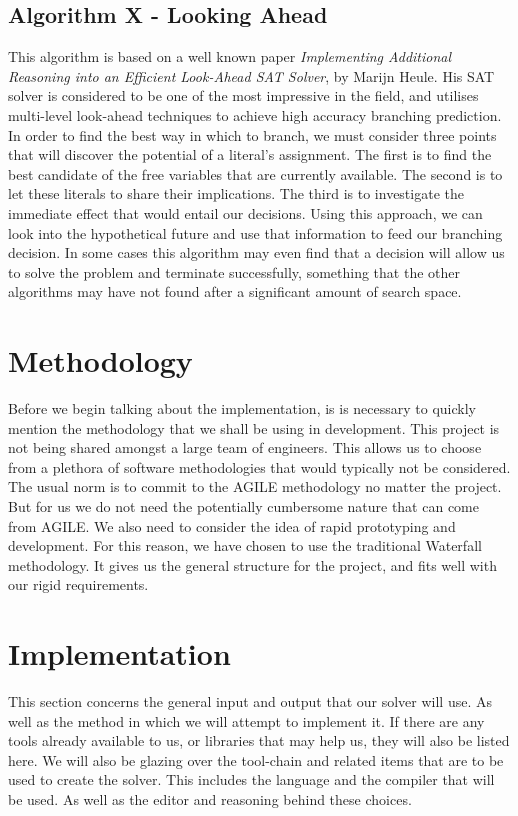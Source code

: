 \documentclass{article}
\begin{document}
\subsection{Algorithm X - Looking Ahead}
This algorithm is based on a well known paper \textit{Implementing Additional Reasoning into an Efficient Look-Ahead SAT Solver},
by Marijn Heule\cite{march}. His SAT solver is considered to be one of the most impressive in the field, and utilises multi-level
look-ahead techniques to achieve high accuracy branching prediction. In order to find the best way in which to branch, we must
consider three points that will discover the potential of a literal's assignment. The first is to find the best candidate of the
free variables that are currently available. The second is to let these literals to share their implications. The third is to
investigate the immediate effect that would entail our decisions. Using this approach, we can look into the hypothetical future
and use that information to feed our branching decision. In some cases this algorithm may even find that a decision will allow us
to solve the problem and terminate successfully, something that the other algorithms may have not found after a significant amount
of search space. 

\section{Methodology}
Before we begin talking about the implementation, is is necessary to quickly mention the methodology that we shall be using in
development. This project is not being shared amongst a large team of engineers. This allows us to choose from a plethora of software methodologies that would typically not be considered. The usual norm is to commit to the AGILE methodology no matter the project. But for us we do not need the potentially cumbersome nature that can come from AGILE. We also need to consider the idea of rapid prototyping and development. For this reason, we have chosen to use the traditional Waterfall methodology. It gives us the general structure for the project, and fits well with our rigid requirements.

\section{Implementation}
This section concerns the general input and output that our solver will use. As well as the method in which we will attempt to
implement it. If there are any tools already available to us, or libraries that may help us, they will also be listed here. We
will also be glazing over the tool-chain and related items that are to be used to create the solver. This includes the language
and the compiler that will be used. As well as the editor and reasoning behind these choices.
\end{document}
